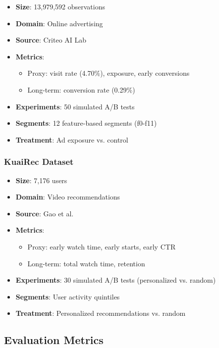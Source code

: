 \documentclass[11pt,twocolumn]{article}
\begin{document}
\begin{itemize}
    \item \textbf{Size}: 13,979,592 observations
    \item \textbf{Domain}: Online advertising
    \item \textbf{Source}: Criteo AI Lab \cite{criteo2021uplift}
    \item \textbf{Metrics}:
    \begin{itemize}
        \item Proxy: visit rate (4.70\%), exposure, early conversions
        \item Long-term: conversion rate (0.29\%)
    \end{itemize}
    \item \textbf{Experiments}: 50 simulated A/B tests
    \item \textbf{Segments}: 12 feature-based segments (f0-f11)
    \item \textbf{Treatment}: Ad exposure vs. control
\end{itemize}

\subsubsection{KuaiRec Dataset}

\begin{itemize}
    \item \textbf{Size}: 7,176 users
    \item \textbf{Domain}: Video recommendations
    \item \textbf{Source}: Gao et al. \cite{gao2022kuairec}
    \item \textbf{Metrics}:
    \begin{itemize}
        \item Proxy: early watch time, early starts, early CTR
        \item Long-term: total watch time, retention
    \end{itemize}
    \item \textbf{Experiments}: 30 simulated A/B tests (personalized vs. random)
    \item \textbf{Segments}: User activity quintiles
    \item \textbf{Treatment}: Personalized recommendations vs. random
\end{itemize}

\subsection{Evaluation Metrics}
\end{document}
